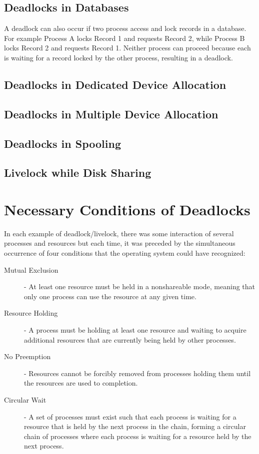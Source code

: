 \documentclass[12pt letter]{report}
\begin{document}
\subsection{Deadlocks in Databases}

A deadlock can also occur if two process access and lock records in a
database. For example Process A locks Record 1 and requests
Record 2, while Process B locks Record 2 and requests Record 1. Neither
process can proceed because each is waiting for a record locked by the
other process, resulting in a deadlock.

\subsection{Deadlocks in Dedicated Device Allocation}

\subsection{Deadlocks in Multiple Device Allocation}

\subsection{Deadlocks in Spooling}

\subsection{Livelock while Disk Sharing}


\section{Necessary Conditions of Deadlocks}

In each example of deadlock/livelock, there was some interaction of
several processes and resources but each time, it was preceded by the
simultaneous occurrence of four conditions that the operating system
could have recognized:
\begin{description}
  \item[Mutual Exclusion]  - At least one resource must be held in a
    nonshareable mode, meaning that only one process can use the
    resource at any given time.
  \item[Resource Holding]  - A process must be holding at least one
    resource and waiting to acquire additional resources that are
    currently being held by other processes.
  \item[No Preemption]  - Resources cannot be forcibly removed from
    processes holding them until the resources are used to
    completion.
  \item[Circular Wait]  - A set of processes must exist such that
    each process is waiting for a resource that is held by the next
    process in the chain, forming a circular chain of processes
    where each process is waiting for a resource held by the next
    process.
\end{description}
\end{document}
